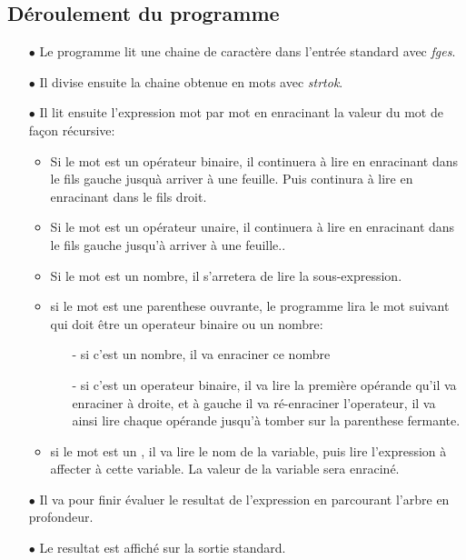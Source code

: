 \documentclass[a4paper,11pt,DIV=11]{scrartcl}
\begin{document}
\begin{onehalfspace}
    \subsection*{Déroulement du programme}

    \begin{itemize}
        \item[$\bullet$] Le programme lit une chaine de caractère dans l'entrée standard avec
            \emph{fges}.
        \item[$\bullet$] Il divise ensuite la chaine obtenue en mots avec \emph{strtok}.
        \item[$\bullet$] Il lit ensuite l'expression mot par mot en enracinant la valeur du mot de
            façon récursive:
            \begin{itemize}
                \item Si le mot est un opérateur binaire, il continuera à lire en enracinant dans
                    le fils gauche jusquà arriver à une feuille. Puis continura à lire en
                    enracinant dans le fils droit.
                \item Si le mot est un opérateur unaire, il continuera à lire en enracinant dans le
                    fils gauche jusqu'à arriver à une feuille..
                \item Si le mot est un nombre, il s'arretera de lire la sous-expression.
                \item si le mot est une parenthese ouvrante, le programme lira le mot suivant qui
                    doit être un operateur binaire ou un nombre:
                    \begin{itemize}
                        \item[-] si c'est un nombre, il va enraciner ce nombre
                        \item[-] si c'est un operateur binaire, il va lire la première opérande qu'il
                            va enraciner à droite, et à gauche il va ré-enraciner l'operateur, il va
                            ainsi lire chaque opérande jusqu'à tomber sur la parenthese fermante.
                    \end{itemize}
                \item si le mot est un \say{=}, il va lire le nom de la variable, puis lire l'expression à
                    affecter à cette variable. La valeur de la variable sera enraciné.
            \end{itemize}
        \item[$\bullet$] Il va pour finir évaluer le resultat de l'expression en parcourant l'arbre en profondeur.
        \item[$\bullet$] Le resultat est affiché sur la sortie standard.
    \end{itemize}



\end{onehalfspace}
\end{document}
